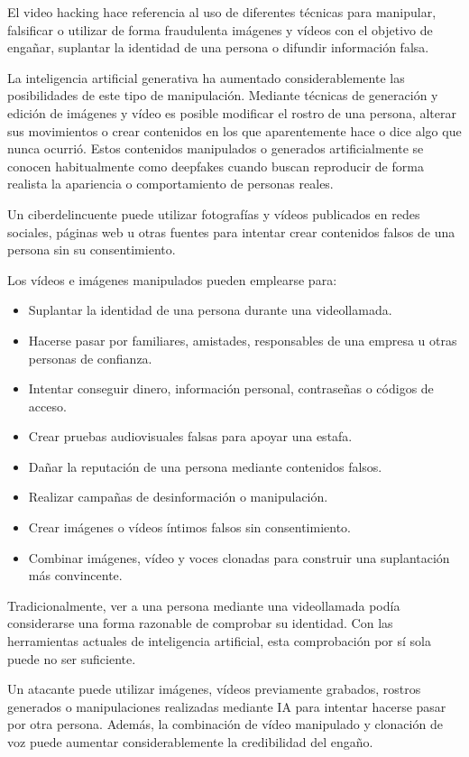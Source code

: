 \documentclass[
  spanish,
  a4paper,
  openany]{book}
\begin{document}
El video hacking hace referencia al uso de diferentes técnicas para manipular, falsificar o utilizar de forma fraudulenta imágenes y vídeos con el objetivo de engañar, suplantar la identidad de una persona o difundir información falsa.

La inteligencia artificial generativa ha aumentado considerablemente las posibilidades de este tipo de manipulación. Mediante técnicas de generación y edición de imágenes y vídeo es posible modificar el rostro de una persona, alterar sus movimientos o crear contenidos en los que aparentemente hace o dice algo que nunca ocurrió. Estos contenidos manipulados o generados artificialmente se conocen habitualmente como deepfakes cuando buscan reproducir de forma realista la apariencia o comportamiento de personas reales.

Un ciberdelincuente puede utilizar fotografías y vídeos publicados en redes sociales, páginas web u otras fuentes para intentar crear contenidos falsos de una persona sin su consentimiento.

Los vídeos e imágenes manipulados pueden emplearse para:

\begin{itemize}
\item
  Suplantar la identidad de una persona durante una videollamada.
\item
  Hacerse pasar por familiares, amistades, responsables de una empresa u otras personas de confianza.
\item
  Intentar conseguir dinero, información personal, contraseñas o códigos de acceso.
\item
  Crear pruebas audiovisuales falsas para apoyar una estafa.
\item
  Dañar la reputación de una persona mediante contenidos falsos.
\item
  Realizar campañas de desinformación o manipulación.
\item
  Crear imágenes o vídeos íntimos falsos sin consentimiento.
\item
  Combinar imágenes, vídeo y voces clonadas para construir una suplantación más convincente.
\end{itemize}

Tradicionalmente, ver a una persona mediante una videollamada podía considerarse una forma razonable de comprobar su identidad. Con las herramientas actuales de inteligencia artificial, esta comprobación por sí sola puede no ser suficiente.

Un atacante puede utilizar imágenes, vídeos previamente grabados, rostros generados o manipulaciones realizadas mediante IA para intentar hacerse pasar por otra persona. Además, la combinación de vídeo manipulado y clonación de voz puede aumentar considerablemente la credibilidad del engaño.
\end{document}
